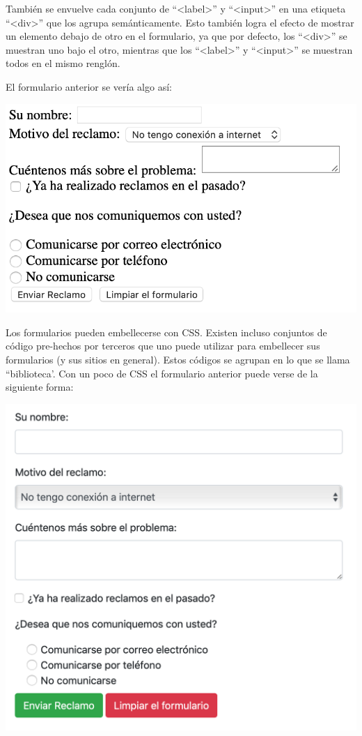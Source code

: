 También se envuelve cada conjunto de ``<label>'' y ``<input>'' en una
etiqueta ``<div>'' que los agrupa semánticamente. Esto también logra el
efecto de mostrar un elemento debajo de otro en el formulario, ya que por
defecto, los ``<div>'' se muestran uno bajo el otro, mientras que los
``<label>'' y ``<input>'' se muestran todos en el mismo renglón.

El formulario anterior se vería algo así:

\includegraphics[scale=0.7]{anexos/1_lenguajes_marcado/2_html/imagenes/form_sample_no_css.png}

Los formularios pueden embellecerse con CSS. Existen incluso conjuntos de código
pre-hechos por terceros que uno puede utilizar para embellecer sus formularios
(y sus sitios en general). Estos códigos se agrupan en lo que se llama ``biblioteca'.
Con un poco de CSS el formulario anterior puede verse de la siguiente forma:

\centerline{\includegraphics[scale=0.5]{anexos/1_lenguajes_marcado/2_html/imagenes/form_sample_css.png}}

